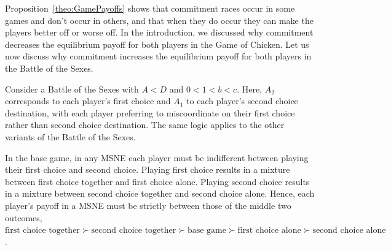 \documentclass[letterpaper]{article}
\theoremstyle{definition}
\begin{document}

Proposition~\ref{theo:GamePayoffs} shows that commitment races occur in some games and don't occur in others, and that when they do occur they can make the players better off or worse off. In the introduction, we discussed why commitment decreases the equilibrium payoff for both players in the Game of Chicken. Let us now discuss why commitment increases the equilibrium payoff for both players in the Battle of the Sexes.

Consider a Battle of the Sexes with $A<D$ and $0<1<b<c$. Here, $A_2$ corresponds to each player's first choice and $A_1$ to each player's second choice destination, with each player preferring to miscoordinate on their first choice rather than second choice destination. The same logic applies to the other variants of the Battle of the Sexes.


In the base game, in any MSNE each player must be indifferent between playing their first choice and second choice. Playing first choice results in a mixture between first choice together and first choice alone. Playing second choice results in a mixture between second choice together and second choice alone. Hence, each player's payoff in a MSNE must be strictly between those of the middle two outcomes, $\text{first choice together} \succ \text{second choice together} \succ \text{base game} \succ \text{first choice alone} \succ \text{second choice alone}$.
\end{document}
